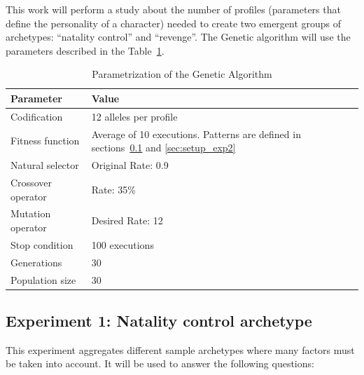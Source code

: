 \documentclass[runningheads]{llncs}
\begin{document}
This work will perform a study about the number of profiles (parameters that define the personality of a character) needed to create two emergent groups of archetypes: ``natality control'' and ``revenge''.
The Genetic algorithm will use the parameters described in the Table~\ref{fig:ga_parameters}. 

\begin{table}
\begin{center}
\caption{Parametrization of the Genetic Algorithm}
\label{fig:ga_parameters}
\begin{tabular}{p{3cm}p{7cm}}
\hline\noalign{\smallskip}
\noalign{\smallskip}
Parameter & Value \\
\hline
\noalign{\smallskip}
Codification & 12 alleles per profile\\
Fitness function & Average of 10 executions. Patterns are defined in sections~\ref{sec:setup_exp1} and \ref{sec:setup_exp2}\\
Natural selector & Original Rate: 0.9 \\
Crossover operator & Rate: 35\% \\
Mutation operator & Desired Rate: 12 \\
Stop condition & 100 executions\\
Generations & 30\\
Population size & 30 \\
\hline
\end{tabular}


\end{center}
\end{table}


\subsection{Experiment 1: Natality control archetype}
\label{sec:setup_exp1}

This experiment aggregates different sample archetypes where many factors must be taken into account. It will be used to answer the following questions:\\

\end{document}
